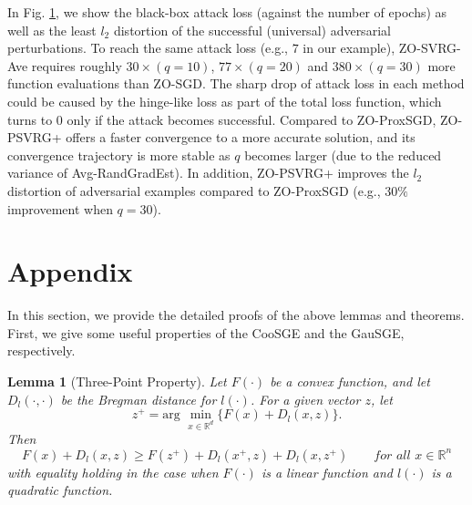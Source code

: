 \documentclass{article}
\newcommand*{\R}{\mathbb{R}}
\newtheorem{lemma}[theorem]{Lemma}
\theoremstyle{definition}
\theoremstyle{remark}
\begin{document}
{ In Fig. \ref{}, we show the black-box attack loss (against the number of epochs) as well as the least $l_2$ distortion of the successful (universal) adversarial perturbations. To reach the same
attack loss (e.g., $7$ in our example), ZO-SVRG-Ave requires roughly $30\times (q = 10)$, $77\times (q = 20)$
and $380\times (q = 30)$ more function evaluations than ZO-SGD. The sharp drop of attack loss in each
method could be caused by the hinge-like loss as part of the total loss function, which turns to $0$ only
if the attack becomes successful. Compared to ZO-ProxSGD, ZO-PSVRG+ offers a faster convergence
to a more accurate solution, and its convergence trajectory is more stable as $q$ becomes larger (due to
the reduced variance of Avg-RandGradEst). In addition, ZO-PSVRG+ improves the $l_2$ distortion
of adversarial examples compared to ZO-ProxSGD (e.g., $30\%$ improvement when $q = 30$). 
}
\section{Appendix}
{\color{Green}
In this section, we provide the detailed proofs of the above lemmas and theorems. First, we give some useful properties of the CooSGE and the GauSGE, respectively.
}
\begin{lemma}[Three-Point Property] Let $F(\cdot)$ be a convex function, and let $D_{l}(\cdot,\cdot)$ be the Bregman distance for $l(\cdot)$. For a given vector $z$, let 
\[
z^+ = \text{arg}\,\,\min_{x\in\R^d}\{F(x)+D_{l}(x,z)\}.
\]
Then 
\begin{equation}
F(x) + D_l(x,z) \geq F(z^+) + D_l(x^+,z) + D_l(x,z^+)\qquad for\,\,all\,\,x\in\R^n
\end{equation}
with equality holding in the case when $F(\cdot)$ is a linear function and $l(\cdot)$ is a quadratic function.
\end{lemma}
\end{document}
